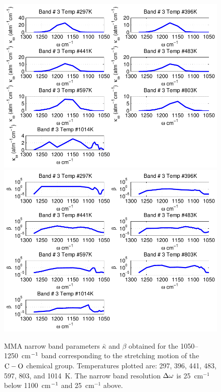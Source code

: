 \begin{figure}[p]
\begin{center}
\includegraphics[width=5.0in]{Figures/MMA_Kappa_Band3_MALKMUS.pdf}
\includegraphics[width=5.0in]{Figures/MMA_Beta_Band3_MALKMUS.pdf}
\end{center}
\caption{MMA narrow band parameters $\bar{\kappa}$ and $\beta$ obtained for the 1050--1250~cm$\rm^{-1}$ band corresponding to the stretching motion of the $\rm C-O$ chemical group. Temperatures plotted are: 297, 396, 441, 483, 597, 803, and 1014~K. The narrow band resolution $\Delta \omega$ is 25~cm$^{-1}$ below 1100~cm$\rm ^{-1}$ and 25~cm$^{-1}$ above.\label{fig:MMA_kappa_beta3}}
\end{figure}

